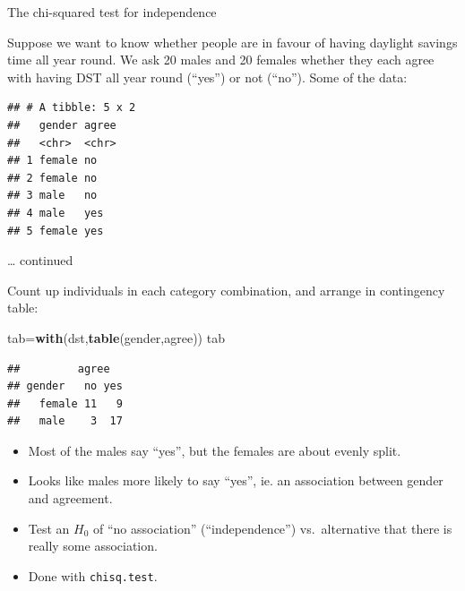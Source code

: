 \documentclass[
  ignorenonframetext,
]{beamer}
\newenvironment{Shaded}{\begin{snugshade}}{\end{snugshade}}
\newcommand{\CommentTok}[1]{\textcolor[rgb]{0.56,0.35,0.01}{\textit{#1}}}
\newcommand{\DecValTok}[1]{\textcolor[rgb]{0.00,0.00,0.81}{#1}}
\newcommand{\KeywordTok}[1]{\textcolor[rgb]{0.13,0.29,0.53}{\textbf{#1}}}
\newcommand{\NormalTok}[1]{#1}
\newcommand{\OperatorTok}[1]{\textcolor[rgb]{0.81,0.36,0.00}{\textbf{#1}}}
\newcommand{\StringTok}[1]{\textcolor[rgb]{0.31,0.60,0.02}{#1}}
\providecommand{\tightlist}{%
  \setlength{\itemsep}{0pt}\setlength{\parskip}{0pt}}
\begin{document}
\begin{frame}[fragile]{The chi-squared test for independence}
\protect\hypertarget{the-chi-squared-test-for-independence}{}

Suppose we want to know whether people are in favour of having daylight
savings time all year round. We ask 20 males and 20 females whether they
each agree with having DST all year round (``yes'') or not (``no'').
Some of the data:

\begin{Shaded}
\end{Shaded}

\begin{verbatim}
## # A tibble: 5 x 2
##   gender agree
##   <chr>  <chr>
## 1 female no   
## 2 female no   
## 3 male   no   
## 4 male   yes  
## 5 female yes
\end{verbatim}

\end{frame}

\begin{frame}[fragile]{\ldots{} continued}
\protect\hypertarget{continued-1}{}

Count up individuals in each category combination, and arrange in
contingency table:

\begin{Shaded}
\begin{Highlighting}[]
\NormalTok{tab=}\KeywordTok{with}\NormalTok{(dst,}\KeywordTok{table}\NormalTok{(gender,agree))}
\NormalTok{tab}
\end{Highlighting}
\end{Shaded}

\begin{verbatim}
##         agree
## gender   no yes
##   female 11   9
##   male    3  17
\end{verbatim}

\begin{itemize}
\tightlist
\item
  Most of the males say ``yes'', but the females are about evenly split.
\item
  Looks like males more likely to say ``yes'', ie. an association
  between gender and agreement.
\item
  Test an \(H_0\) of ``no association'' (``independence'')
  vs.~alternative that there is really some association.
\item
  Done with \texttt{chisq.test}.
\end{itemize}

\end{frame}
\end{document}

